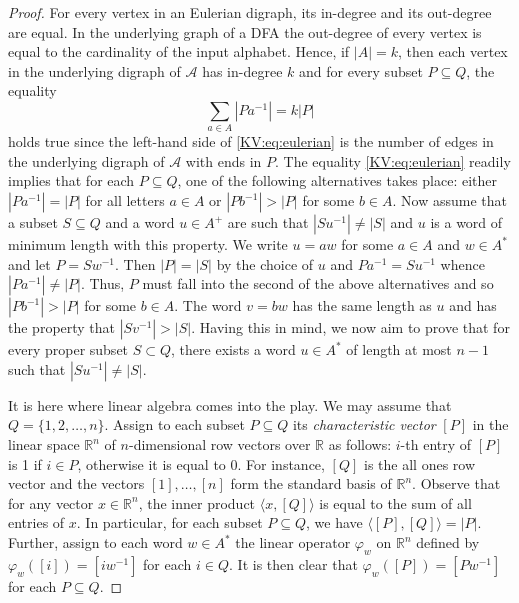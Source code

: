 \documentclass{irmaart}
\theoremstyle{plain}
\begin{document}
\begin{proof}
For every vertex in an Eulerian digraph, its in-degree and its out-degree are
equal. In the underlying graph of a DFA the out-degree of every vertex is equal
to the cardinality of the input alphabet. Hence, if $|A|=k$, then each vertex
in the underlying digraph of $\mathcal{A}$ has in-degree $k$ and for every
subset $P\subseteq Q$, the equality
\begin{equation}
\label{KV:eq:eulerian} \sum_{a\in A}|Pa^{-1}|=k|P|
\end{equation}
holds true since the left-hand side of \eqref{KV:eq:eulerian} is the number of
edges in the underlying digraph of $\mathcal{A}$ with ends in $P$. The equality
\eqref{KV:eq:eulerian} readily implies that for each $P\subseteq Q$, one of the
following alternatives takes place: either $|Pa^{-1}|=|P|$ for all letters
$a\in A$ or $|Pb^{-1}|>|P|$ for some $b\in A$. Now assume that a subset
$S\subseteq Q$ and a word $u\in A^+$ are such that $|Su^{-1}|\ne|S|$ and $u$ is
a word of minimum length with this property. We write $u=aw$ for some $a\in A$
and $w\in A^*$ and let $P=Sw^{-1}$. Then $|P|=|S|$ by the choice of $u$ and
$Pa^{-1}=Su^{-1}$ whence $|Pa^{-1}|\ne|P|$. Thus, $P$ must fall into the second
of the above alternatives and so $|Pb^{-1}|>|P|$ for some $b\in A$. The word
$v=bw$ has the same length as $u$ and has the property that $|Sv^{-1}|>|S|$.
Having this in mind, we now aim to prove that for every proper subset $S\subset
Q$, there exists a word $u\in A^*$ of length at most $n-1$ such that
$|Su^{-1}|\ne|S|$.

It is here where linear algebra comes into the play. We may assume that
$Q=\{1,2,\dots,n\}$. Assign to each subset $P\subseteq Q$ its
\emph{characteristic vector} $[P]$ in the linear
space $\mathbb{R}^n$ of $n$-dimensional row vectors over $\mathbb{R}$ as
follows: $i$-th entry of $[P]$ is 1 if $i\in P$, otherwise it is equal to 0.
For instance, $[Q]$ is the all ones row vector and the vectors $[1],\dots,[n]$
form the standard basis of $\mathbb{R}^n$. Observe that for any vector
$x\in\mathbb{R}^n$, the inner product $\langle x,[Q]\rangle$ is equal to the
sum of all entries of $x$. In particular, for each subset $P\subseteq Q$, we
have $\langle[P],[Q]\rangle=|P|$. Further, assign to each word $w\in A^*$ the
linear operator $\varphi_w$ on $\mathbb{R}^n$ defined by
$\varphi_w([i])=[iw^{-1}]$ for each $i\in Q$. It is then clear that
$\varphi_w([P])=[Pw^{-1}]$ for each $P\subseteq Q$.


\end{proof}
\end{document}
